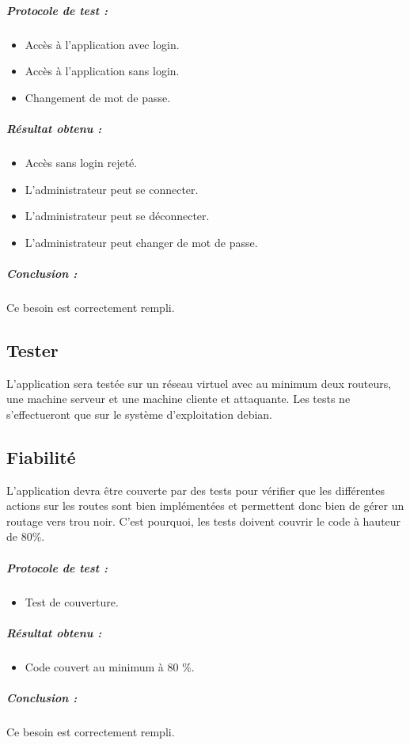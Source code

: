 \subparagraph{Protocole de test :}
\begin{itemize}
    \item Accès à l'application avec login.
    \item Accès à l'application sans login.
    \item Changement de mot de passe.
\end{itemize}
\subparagraph{Résultat obtenu :}
    \begin{itemize}
    \item Accès sans login rejeté.
    \item L'administrateur peut se connecter.
    \item L'administrateur peut se déconnecter.
    \item L'administrateur peut changer de mot de passe.
\end{itemize}
\subparagraph{Conclusion :}Ce besoin est correctement rempli.

\subsection{Tester}
L'application sera testée sur un réseau virtuel avec au minimum deux routeurs, une machine serveur et une machine cliente et attaquante. Les tests ne s'effectueront que sur le système d'exploitation debian.

\subsection{Fiabilité}
L'application devra être couverte par des tests pour vérifier que les différentes actions sur les routes sont bien implémentées et permettent donc bien de gérer un routage vers trou noir. C'est pourquoi, les tests doivent couvrir le code à hauteur de 80\%.

\subparagraph{Protocole de test :}
\begin{itemize}
    \item Test de couverture.
\end{itemize}
\subparagraph{Résultat obtenu :}
    \begin{itemize}
    \item Code couvert au minimum à 80 \%.
\end{itemize}
\subparagraph{Conclusion :}Ce besoin est correctement rempli.
